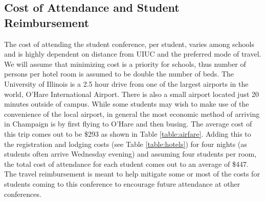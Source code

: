 

\subsection{Cost of Attendance and Student Reimbursement}
The cost of attending the student conference, per student, varies among schools and is highly dependent on distance from UIUC and the preferred mode of travel. We will assume that minimizing cost is a priority for schools, thus number of persons per hotel room is assumed to be double the number of beds. The University of Illinois is a 2.5 hour drive from one of the largest airports in the world, O'Hare International Airport. There is also a small airport located just 20 minutes outside of campus. While some students may wish to make use of the convenience of the local airport, in general the most economic method of arriving in Champaign is by first flying to O’Hare and then busing. The average cost of this trip comes out to be \$293 as shown in Table  \ref{table:airfare}. Adding this to the registration and lodging costs (see Table \ref{table:hotels}) for four nights (as students often arrive Wednesday evening) and assuming four students per room, the total cost of attendance for each student comes out to an average of \$447. The travel reimbursement is meant to help mitigate some or most of the costs for students coming to this conference to encourage future attendance at other conferences.


